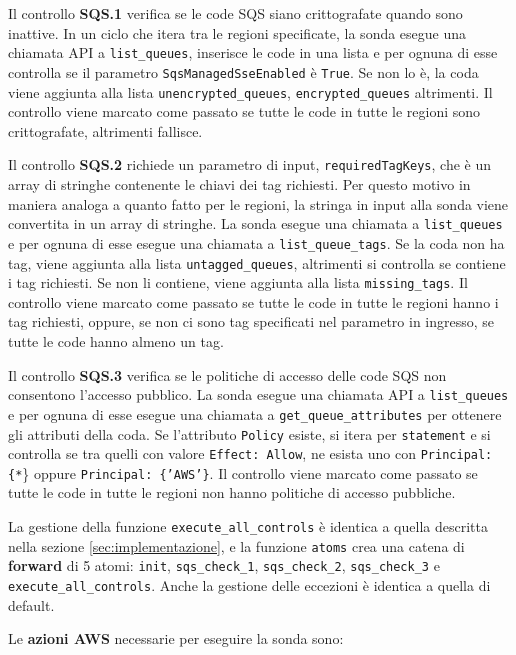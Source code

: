 Il controllo \textbf{SQS.1} verifica se le code SQS siano crittografate quando sono inattive. In un ciclo che itera tra le regioni specificate, la sonda esegue una chiamata API a \texttt{list\_queues}, inserisce le code in una lista e per ognuna di esse controlla se il parametro \texttt{SqsManagedSseEnabled} è \texttt{True}. Se non lo è, la coda viene aggiunta alla lista \texttt{unencrypted\_queues}, \texttt{encrypted\_queues} altrimenti. Il controllo viene marcato come passato se tutte le code in tutte le regioni sono crittografate, altrimenti fallisce.

Il controllo \textbf{SQS.2} richiede un parametro di input, \texttt{requiredTagKeys}, che è un array di stringhe contenente le chiavi dei tag richiesti. Per questo motivo in maniera analoga a quanto fatto per le regioni, la stringa in input alla sonda viene convertita in un array di stringhe. La sonda esegue una chiamata a \texttt{list\_queues} e per ognuna di esse esegue una chiamata a \texttt{list\_queue\_tags}. Se la coda non ha tag, viene aggiunta alla lista \texttt{untagged\_queues}, altrimenti si controlla se contiene i tag richiesti. Se non li contiene, viene aggiunta alla lista \texttt{missing\_tags}. Il controllo viene marcato come passato se tutte le code in tutte le regioni hanno i tag richiesti, oppure, se non ci sono tag specificati nel parametro in ingresso, se tutte le code hanno almeno un tag.

Il controllo \textbf{SQS.3} verifica se le politiche di accesso delle code SQS non consentono l'accesso pubblico. La sonda esegue una chiamata API a \texttt{list\_queues} e per ognuna di esse esegue una chiamata a \texttt{get\_queue\_attributes} per ottenere gli attributi della coda. Se l'attributo \texttt{Policy} esiste, si itera per \texttt{statement} e si controlla se tra quelli con valore \texttt{Effect: Allow}, ne esista uno con \texttt{Principal: \{*}\} oppure \texttt{Principal: \{'AWS'\}}. Il controllo viene marcato come passato se tutte le code in tutte le regioni non hanno politiche di accesso pubbliche.

La gestione della funzione \texttt{execute\_all\_controls} è identica a quella descritta nella sezione \ref{sec:implementazione}, e la funzione \texttt{atoms} crea una catena di \textbf{forward} di 5 atomi: \texttt{init}, \texttt{sqs\_check\_1}, \texttt{sqs\_check\_2}, \texttt{sqs\_check\_3} e \texttt{execute\_all\_controls}. Anche la gestione delle eccezioni è identica a quella di default.

Le \textbf{azioni AWS} necessarie per eseguire la sonda sono:

